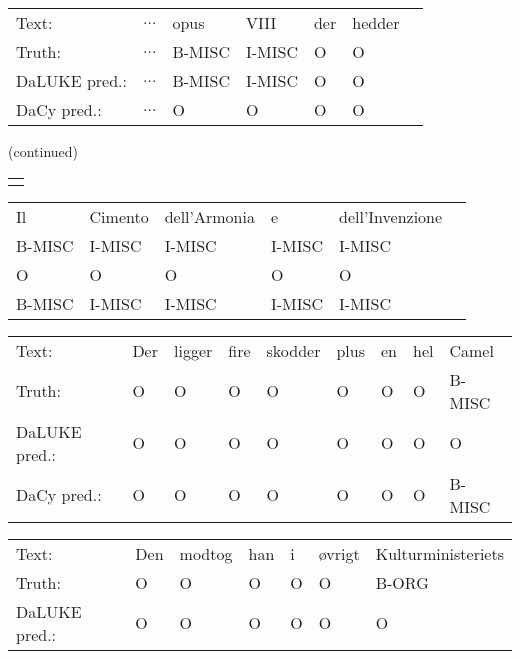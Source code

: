 \documentclass[main.tex]{subfiles}
\begin{document}
\begin{table}[H]
    \footnotesize
    \begin{tabular}{l|llllll}
        Text:             & $\ldots$  & opus    & VIII    & der  & hedder  \\
        Truth:            & $\ldots$  & B-MISC  & I-MISC  & O    & O       \\\hline
        DaLUKE pred.:     & $\ldots$  & B-MISC  & I-MISC  & O    & O       \\
        DaCy pred.:       & $\ldots$  & O       & O       & O    & O
    \end{tabular}
    (continued)\\
    \begin{tabular}{c} %
        \quad \quad \quad \quad \quad \quad \quad \quad \quad \quad \quad
    \end{tabular}
    \begin{tabular}{llllll}
            Il      & Cimento  & dell'Armonia  & e       & dell'Invenzione \\
            B-MISC  & I-MISC   & I-MISC        & I-MISC  & I-MISC          \\\hline
            O       & O        & O             & O       & O               \\
            B-MISC  & I-MISC   & I-MISC        & I-MISC  & I-MISC
    \end{tabular}\vspace*{1em}
    \begin{tabular}{l|llllllll}
        Text:             & Der  & ligger  & fire  & skodder  & plus  & en  & hel  & Camel   \\
        Truth:            & O    & O       & O     & O        & O     & O   & O    & B-MISC  \\\hline
        DaLUKE pred.:     & O    & O       & O     & O        & O     & O   & O    & O       \\
        DaCy pred.:    & O    & O       & O     & O        & O     & O   & O    & B-MISC
    \end{tabular}\vspace*{1em}
    \begin{tabular}{l|llllll}
        Text:            & Den  & modtog  & han  & i  & øvrigt  & Kulturministeriets\\
        Truth:           & O    & O       & O    & O  & O       & B-ORG             \\\hline
        DaLUKE  pred.:   & O    & O       & O    & O  & O       & O                 \\

\end{tabular}
\end{table}
\end{document}

